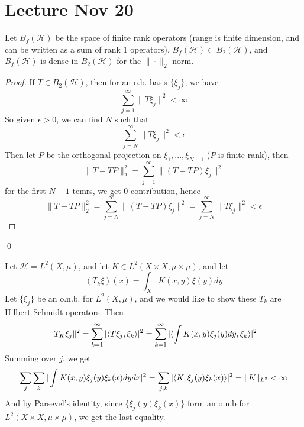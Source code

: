 \section{Lecture Nov 20}
\begin{proposition}
    Let $B_f(\mathcal{H})$ be the space of finite rank operators (range is finite dimension, and can be written as a sum of rank 1 operators), $B_f(\mathcal{H})\subset B_2(\mathcal{H})$, and $B_f(\mathcal{H})$ is dense in $B_2(\mathcal{H})$ for the $\|\cdot\|_2$ norm.
\end{proposition}
\begin{proof}
    If $T\in B_2(\mathcal{H})$, then for an o.b. basis $\{\xi_j\}$, we have 
    \begin{equation*}
        \sum_{j=1}^\infty\|T\xi_j\|^2<\infty
    \end{equation*}
    So given $\epsilon>0$, we can find $N$ such that 
    \begin{equation*}
        \sum_{j=N}^\infty\|T\xi_j\|^2<\epsilon
    \end{equation*}
    Then let $P$ be the orthogonal projection on $\xi_1, ..., \xi_{N-1}$ ($P$ is finite rank), then 
    \begin{equation*}
        \|T-TP\|_2^2=\sum_{j=1}^\infty\|(T-TP)\xi_j\|^2
    \end{equation*}
    for the first $N-1$ temrs, we get 0 contribution, hence 
    \begin{equation*}
        \|T-TP\|_2^2=\sum_{j=N}^\infty\|(T-TP)\xi_j\|^2=\sum_{j=N}^\infty\|T\xi_j\|^2<\epsilon
    \end{equation*}
\end{proof}
\qed


Let $\mathcal{H}=L^2(X,\mu)$, and let $K\in L^2(X\times X, \mu\times\mu)$, and let 
\begin{equation*}
    (T_k\xi)(x)=\int_XK(x,y)\xi(y)dy
\end{equation*}
Let $\{\xi_j\}$ be an o.n.b. for $L^2(X,\mu)$, and we would like to show these $T_k$ are Hilbert-Schmidt operators. Then 
\begin{equation*}
    \|T_K\xi_j\|^2=\sum_{k=1}^\infty |\langle T\xi_j, \xi_k\rangle|^2=\sum_{k=1}^\infty|\langle \int K(x,y)\xi_j(y)dy, \xi_k\rangle|^2
\end{equation*}
Summing over $j$, we get 
\begin{equation*}
    \sum_{j}\sum_k|\int K(x,y)\xi_j(y)\xi_k(x)dydx|^2=\sum_{j,k}|\langle K, \xi_j(y)\xi_k(x)\rangle|^2=\|K\|_{L^2}<\infty
\end{equation*}
And by Parsevel's identity, since $\{\xi_j(y)\xi_k(x)\}$ form an o.n.b for $L^2(X\times X, \mu\times\mu)$, we get the last equality.

